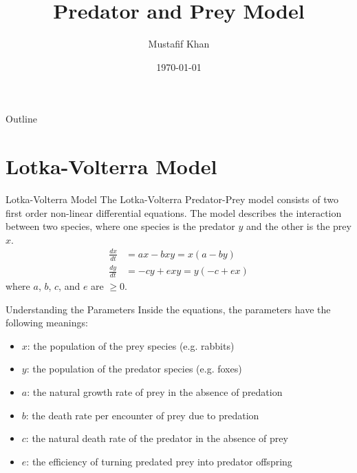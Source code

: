 \documentclass[10pt]{beamer}
\title[Predator and Prey Model]{Predator and Prey Model}
\author[Mustafif Khan]{Mustafif Khan}
\institute[TMU]{MTH630-W2024}
\date{\today}
\begin{document}
\begin{frame}
    \titlepage
\end{frame}

\begin{frame}{Outline}
    \tableofcontents
\end{frame}

\section{Lotka-Volterra Model}
\begin{frame}{Lotka-Volterra Model}
    The Lotka-Volterra Predator-Prey model consists of two first order
    non-linear differential equations. The model describes the interaction
    between
    two species, where one species is the predator $y$ and the other is the
    prey
    $x$.
    \begin{align}
        \frac{dx}{dt} & = ax - bxy = x(a-by)     \\
        \frac{dy}{dt} & = -cy + exy = y(-c + ex)
    \end{align}
    where $a$, $b$, $c$, and $e$ are $\geq 0$.
\end{frame}

\begin{frame}{Understanding the Parameters}
    Inside the equations, the parameters have the following meanings:

    \begin{itemize}
        \item $x$: the population of the prey species (e.g. rabbits)
        \item $y$: the population of the predator species (e.g. foxes)
        \item $a$: the natural growth rate of prey in the absence of predation
        \item $b$: the death rate per encounter of prey due to predation
        \item $c$: the natural death rate of the predator in the absence of
              prey
        \item $e$: the efficiency of turning predated prey into predator
              offspring
    \end{itemize}
\end{frame}
\end{document}
